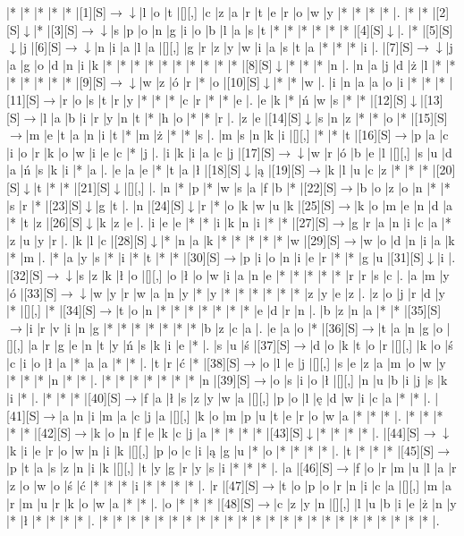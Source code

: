 \documentclass[11pt]{article}
\newcommand\drarr{$\rightarrow \!\!\!\!\! \downarrow$}
\newcommand\rarr{$\rightarrow$}
\newcommand\darr{$\downarrow$}
\begin{document}
\noindent\begin{Puzzle}{23}{32}|*	|*	|*	|*	|*	|[1][S]\drarr	|l	|o	|t	|[][,]{ }	|c	|z	|a	|r	|t	|e	|r	|o	|w	|y	|*	|*	|*	|*	|.
|*	|*	|[2][S]\darr	|*	|[3][S]\drarr	|s	|p	|o	|n	|g	|i	|o	|b	|l	|a	|s	|t	|*	|*	|*	|*	|*	|*	|[4][S]\darr	|.
|*	|[5][S]\darr	|j	|[6][S]\drarr	|n	|i	|a	|l	|a	|[][,]{ }	|g	|r	|z	|y	|w	|i	|a	|s	|t	|a	|*	|*	|*	|i	|.
|[7][S]\drarr	|j	|a	|g	|o	|d	|n	|i	|k	|*	|*	|*	|*	|*	|*	|*	|*	|*	|*	|[8][S]\darr	|*	|*	|*	|n	|.
|n	|a	|j	|d	|ż	|l	|*	|*	|*	|*	|*	|*	|*	|[9][S]\drarr	|w	|z	|ó	|r	|*	|o	|[10][S]\darr	|*	|*	|w	|.
|i	|n	|a	|a	|o	|i	|*	|*	|*	|[11][S]\rarr	|r	|o	|s	|t	|r	|y	|*	|*	|*	|c	|r	|*	|*	|e	|.
|e	|k	|*	|ń	|w	|s	|*	|*	|[12][S]\darr	|[13][S]\rarr	|l	|a	|b	|i	|r	|y	|n	|t	|*	|h	|o	|*	|*	|r	|.
|z	|e	|[14][S]\darr	|s	|n	|z	|*	|*	|o	|*	|[15][S]\rarr	|m	|e	|t	|a	|n	|i	|t	|*	|m	|ż	|*	|*	|s	|.
|m	|s	|n	|k	|i	|[][,]{ }	|*	|*	|t	|[16][S]\rarr	|p	|a	|c	|i	|o	|r	|k	|o	|w	|i	|e	|c	|*	|j	|.
|i	|k	|i	|a	|c	|j	|[17][S]\drarr	|w	|r	|ó	|b	|e	|l	|[][,]{ }	|s	|u	|d	|a	|ń	|s	|k	|i	|*	|a	|.
|e	|a	|e	|*	|t	|a	|ł	|[18][S]\darr	|ą	|[19][S]\rarr	|k	|l	|u	|c	|z	|*	|*	|*	|[20][S]\darr	|t	|*	|*	|[21][S]\darr	|[][,]{ }	|.
|n	|*	|p	|*	|w	|s	|a	|f	|b	|*	|[22][S]\rarr	|b	|o	|z	|o	|n	|*	|*	|s	|r	|*	|[23][S]\darr	|g	|t	|.
|n	|[24][S]\darr	|r	|*	|o	|k	|w	|u	|k	|[25][S]\rarr	|k	|o	|m	|e	|n	|d	|a	|*	|t	|z	|[26][S]\darr	|k	|z	|e	|.
|i	|e	|e	|*	|*	|i	|k	|n	|i	|*	|*	|[27][S]\rarr	|g	|r	|a	|n	|i	|c	|a	|*	|z	|u	|y	|r	|.
|k	|l	|c	|[28][S]\darr	|*	|n	|a	|k	|*	|*	|*	|*	|*	|w	|[29][S]\rarr	|w	|o	|d	|n	|i	|a	|k	|*	|m	|.
|*	|a	|y	|s	|*	|i	|*	|t	|*	|*	|[30][S]\rarr	|p	|i	|o	|n	|i	|e	|r	|*	|*	|g	|u	|[31][S]\darr	|i	|.
|[32][S]\drarr	|s	|z	|k	|ł	|o	|[][,]{ }	|o	|ł	|o	|w	|i	|a	|n	|e	|*	|*	|*	|*	|*	|r	|r	|s	|c	|.
|a	|m	|y	|ó	|[33][S]\drarr	|w	|y	|r	|w	|a	|n	|y	|*	|y	|*	|*	|*	|*	|*	|*	|z	|y	|e	|z	|.
|z	|o	|j	|r	|d	|y	|*	|[][,]{ }	|*	|[34][S]\rarr	|t	|o	|n	|*	|*	|*	|*	|*	|*	|*	|e	|d	|r	|n	|.
|b	|z	|n	|a	|*	|*	|[35][S]\rarr	|i	|r	|v	|i	|n	|g	|*	|*	|*	|*	|*	|*	|*	|b	|z	|c	|a	|.
|e	|a	|o	|*	|[36][S]\rarr	|t	|a	|n	|g	|o	|[][,]{ }	|a	|r	|g	|e	|n	|t	|y	|ń	|s	|k	|i	|e	|*	|.
|s	|u	|ś	|[37][S]\rarr	|d	|o	|k	|t	|o	|r	|[][,]{ }	|k	|o	|ś	|c	|i	|o	|ł	|a	|*	|a	|a	|*	|*	|.
|t	|r	|ć	|*	|[38][S]\rarr	|o	|l	|e	|j	|[][,]{ }	|s	|e	|z	|a	|m	|o	|w	|y	|*	|*	|*	|n	|*	|*	|.
|*	|*	|*	|*	|*	|*	|*	|n	|[39][S]\rarr	|o	|s	|i	|o	|ł	|[][,]{ }	|n	|u	|b	|i	|j	|s	|k	|i	|*	|.
|*	|*	|*	|[40][S]\rarr	|f	|a	|ł	|s	|z	|y	|w	|a	|[][,]{ }	|p	|o	|l	|ę	|d	|w	|i	|c	|a	|*	|*	|.
|[41][S]\rarr	|a	|n	|i	|m	|a	|c	|j	|a	|[][,]{ }	|k	|o	|m	|p	|u	|t	|e	|r	|o	|w	|a	|*	|*	|*	|.
|*	|*	|*	|*	|*	|[42][S]\rarr	|k	|o	|n	|f	|e	|k	|c	|j	|a	|*	|*	|*	|*	|[43][S]\darr	|*	|*	|*	|*	|.
|[44][S]\drarr	|k	|i	|e	|r	|o	|w	|n	|i	|k	|[][,]{ }	|p	|o	|c	|i	|ą	|g	|u	|*	|o	|*	|*	|*	|*	|.
|t	|*	|*	|*	|[45][S]\rarr	|p	|t	|a	|s	|z	|n	|i	|k	|[][,]{ }	|t	|y	|g	|r	|y	|s	|i	|*	|*	|*	|.
|a	|[46][S]\rarr	|f	|o	|r	|m	|u	|l	|a	|r	|z	|o	|w	|o	|ś	|ć	|*	|*	|*	|i	|*	|*	|*	|*	|.
|r	|[47][S]\rarr	|t	|o	|p	|o	|r	|n	|i	|c	|a	|[][,]{ }	|m	|a	|r	|m	|u	|r	|k	|o	|w	|a	|*	|*	|.
|o	|*	|*	|*	|[48][S]\rarr	|c	|z	|y	|n	|[][,]{ }	|l	|u	|b	|i	|e	|ż	|n	|y	|*	|ł	|*	|*	|*	|*	|.
|*	|*	|*	|*	|*	|*	|*	|*	|*	|*	|*	|*	|*	|*	|*	|*	|*	|*	|*	|*	|*	|*	|*	|*	|.\end{Puzzle}
\end{document}
